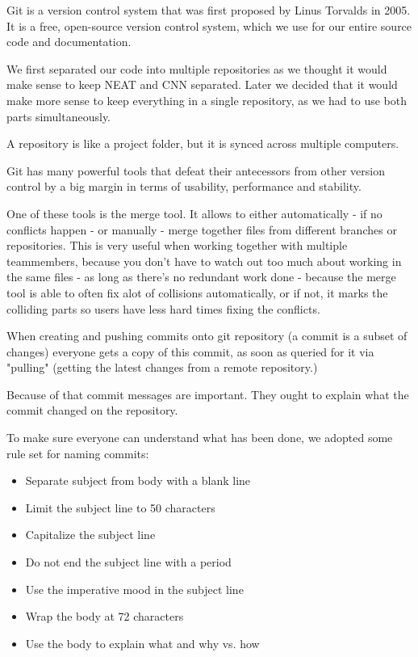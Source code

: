 Git is a version control system that was first proposed by Linus Torvalds in 2005. \cite{Torvalds} \\
It is a free, open-source version control system, which we use for our entire source code and documentation.

We first separated our code into multiple repositories \cite{gitrepo} as we thought it would make sense to keep NEAT and CNN separated. Later we decided that it would make more sense to keep everything in a single repository, as we had to use both parts simultaneously.

A repository is like a project folder, but it is synced across multiple computers.

Git has many powerful tools that defeat their antecessors from other version control by a big margin in terms of usability, performance and stability.

One of these tools is the merge tool. It allows to either automatically - if no conflicts happen - or manually - merge together files from different branches or repositories. This is very useful when working together with multiple teammembers, because you don't have to watch out too much about working in the same files - as long as there's no redundant work done - because the merge tool is able to often fix alot of collisions automatically, or if not, it marks the colliding parts so users have less hard times fixing the conflicts.

When creating and pushing commits onto git repository (a commit is a subset of changes) everyone gets a copy of this commit, as soon as queried for it via "pulling" (getting the latest changes from a remote repository.)\cite{Torvalds}

Because of that commit messages are important. They ought to explain what the commit changed on the repository.

To make sure everyone can understand what has been done, we adopted some rule set for naming commits\cite{Beams2014}:

\begin{itemize}
	\item Separate subject from body with a blank line
	\item Limit the subject line to 50 characters
	\item Capitalize the subject line
	\item Do not end the subject line with a period
	\item Use the imperative mood in the subject line
	\item Wrap the body at 72 characters
	\item Use the body to explain what and why vs. how
\end{itemize}

